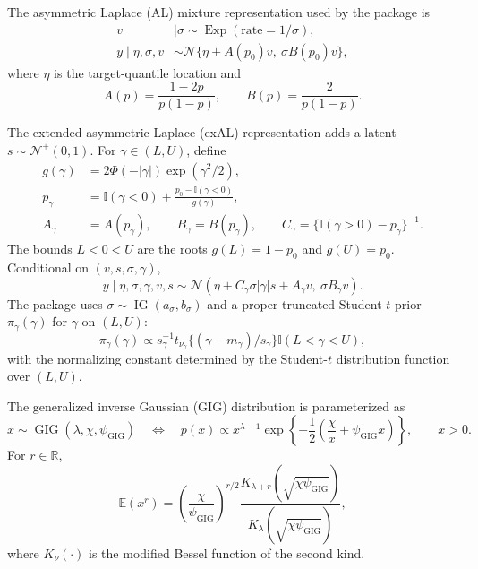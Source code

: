 \documentclass{jss}
\newcommand{\N}{\mathcal{N}}
\newcommand{\IG}{\operatorname{IG}}
\newcommand{\Exp}{\operatorname{Exp}}
\newcommand{\R}{\mathbb{R}}
\newcommand{\Ind}{\mathbb{I}}
\renewcommand{\E}{\mathbb{E}}
\newcommand{\TNp}{\mathcal{N}^{+}}
\newcommand{\GIG}{\operatorname{GIG}}
\newcommand{\pigamma}{\pi_\gamma}
\begin{document}
The asymmetric Laplace (AL) mixture representation used by the package is
\begin{align}
v &\mid \sigma \sim \Exp(\text{rate}=1/\sigma),\\
y \mid \eta,\sigma,v
&\sim \N\{ \eta + A(p_0)v,\ \sigma B(p_0)v \},
\end{align}
where $\eta$ is the target-quantile location and
\begin{equation}
A(p)=\frac{1-2p}{p(1-p)}, \qquad B(p)=\frac{2}{p(1-p)}.
\label{eq:al_AB}
\end{equation}

The extended asymmetric Laplace (exAL) representation adds a latent
$s\sim\TNp(0,1)$. For $\gamma\in(L,U)$, define
\begin{align}
g(\gamma) &= 2\Phi(-|\gamma|)\exp(\gamma^2/2),\\
p_\gamma &= \Ind(\gamma<0) +
  \frac{p_0-\Ind(\gamma<0)}{g(\gamma)},\\
A_\gamma &= A(p_\gamma),\qquad
B_\gamma = B(p_\gamma),\qquad
C_\gamma = \{\Ind(\gamma>0)-p_\gamma\}^{-1}.
\label{eq:exal_ABC}
\end{align}
The bounds $L<0<U$ are the roots $g(L)=1-p_0$ and $g(U)=p_0$. Conditional on
$(v,s,\sigma,\gamma)$,
\begin{equation}
y\mid \eta,\sigma,\gamma,v,s
\sim
\N\left(\eta + C_\gamma\sigma|\gamma|s + A_\gamma v,\
\sigma B_\gamma v \right).
\label{eq:exal_aug}
\end{equation}
The package uses $\sigma\sim\IG(a_\sigma,b_\sigma)$ and a proper truncated
Student-$t$ prior $\pigamma(\gamma)$ for $\gamma$ on $(L,U)$:
\begin{equation}
\pigamma(\gamma)
\propto
s_\gamma^{-1}t_{\nu_\gamma}\{(\gamma-m_\gamma)/s_\gamma\}
\Ind(L<\gamma<U),
\label{eq:gamma_prior}
\end{equation}
with the normalizing constant determined by the Student-$t$ distribution
function over $(L,U)$.

The generalized inverse Gaussian (GIG) distribution is parameterized as
\begin{equation}
x\sim\GIG(\lambda,\chi,\psi_{\mathrm{GIG}})
\quad\Longleftrightarrow\quad
p(x)\propto x^{\lambda-1}
\exp\left\{-\frac{1}{2}\left(\frac{\chi}{x}
+\psi_{\mathrm{GIG}} x\right)\right\},\qquad x>0.
\label{eq:gig_parameterization}
\end{equation}
For $r\in\R$,
\begin{equation}
\E(x^r)=
\left(\frac{\chi}{\psi_{\mathrm{GIG}}}\right)^{r/2}
\frac{K_{\lambda+r}(\sqrt{\chi\psi_{\mathrm{GIG}}})}
{K_{\lambda}(\sqrt{\chi\psi_{\mathrm{GIG}}})},
\label{eq:gig_moments}
\end{equation}
where $K_\nu(\cdot)$ is the modified Bessel function of the second kind.
\end{document}
